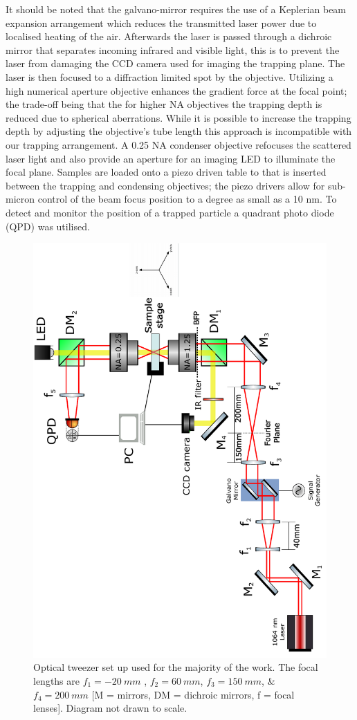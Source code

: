 It should be noted that the galvano-mirror requires the use of a 
Keplerian beam expansion arrangement which reduces the transmitted 
laser power due to localised heating of the air. Afterwards the 
laser is passed through a dichroic mirror that separates incoming 
infrared and visible light, this is to prevent the laser from 
damaging the CCD camera used for imaging the trapping plane. The 
laser is then focused to a diffraction limited spot by the objective. 
Utilizing a high numerical aperture objective enhances the gradient 
force at the focal point; the trade-off being that the for higher NA 
objectives the trapping depth is reduced due to spherical aberrations. 
While it is possible to increase the trapping depth \cite{Reihani2006} 
by adjusting the objective's tube length this approach is incompatible 
with our trapping arrangement. A 0.25 NA condenser objective refocuses 
the scattered laser light and also provide an aperture for an imaging 
LED to illuminate the focal plane. Samples are loaded onto a piezo 
driven table to that is inserted between the trapping and condensing 
objectives; the piezo drivers allow for sub-micron control of the 
beam focus position to a degree as small as a 10 nm. To detect and 
monitor the position of a trapped particle a quadrant photo diode 
(QPD) was utilised. 
\begin{figure}[h!]
	\centering
	\includegraphics[height=\linewidth, angle=270]{tweezer_setup.pdf}
	\caption{Optical tweezer set up used for the majority of the work. 
		The focal lengths are $f_1= -20\ mm $ , $f_2=60\ mm$, $f_3=150\ 
		mm$, \& $f_4=200\ mm$ [M = mirrors, DM = dichroic mirrors, f = 
		focal lenses]. Diagram not drawn to scale.}
	\label{fig:setup}
\end{figure}

